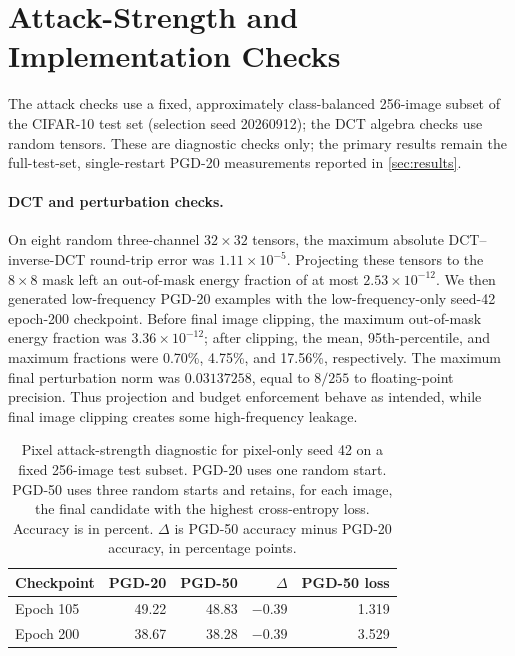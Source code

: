 \documentclass{article}
\begin{document}
\FloatBarrier
\section{Attack-Strength and Implementation Checks}
\label{app:checks}
The attack checks use a fixed, approximately class-balanced 256-image subset
of the CIFAR-10 test set (selection seed 20260912); the DCT algebra checks use
random tensors. These are diagnostic checks only; the primary results remain the full-test-set,
single-restart PGD-20 measurements reported in \cref{sec:results}.

\paragraph{DCT and perturbation checks.}
On eight random three-channel $32\times32$ tensors, the maximum absolute DCT--inverse-DCT
round-trip error was $1.11\times10^{-5}$. Projecting these tensors to the
$8\times8$ mask left an out-of-mask energy fraction of at most
$2.53\times10^{-12}$. We then generated low-frequency PGD-20 examples with the
low-frequency-only seed-42 epoch-200 checkpoint. Before final image clipping,
the maximum out-of-mask energy fraction was $3.36\times10^{-12}$; after
clipping, the mean, 95th-percentile, and maximum fractions were 0.70\%,
4.75\%, and 17.56\%, respectively. The maximum final perturbation norm was
$0.03137258$, equal to $8/255$ to floating-point precision. Thus projection
and budget enforcement behave as intended, while final image clipping creates
some high-frequency leakage.

\begin{table}[t]
\centering
\caption{Pixel attack-strength diagnostic for pixel-only seed 42 on a fixed
256-image test subset. PGD-20 uses one random start. PGD-50 uses three random
starts and retains, for each image, the final candidate with the highest
cross-entropy loss. Accuracy is in percent. $\Delta$ is PGD-50 accuracy minus
PGD-20 accuracy, in percentage points.}
\label{tab:attack-strength}
\begin{tabular*}{\linewidth}{@{\extracolsep{\fill}}lrrrr@{}}
\toprule
Checkpoint & PGD-20 & PGD-50 & $\Delta$ & PGD-50 loss \\
\midrule
Epoch 105 & 49.22 & 48.83 & $-0.39$ & 1.319 \\
Epoch 200 & 38.67 & 38.28 & $-0.39$ & 3.529 \\
\bottomrule
\end{tabular*}
\end{table}
\end{document}

